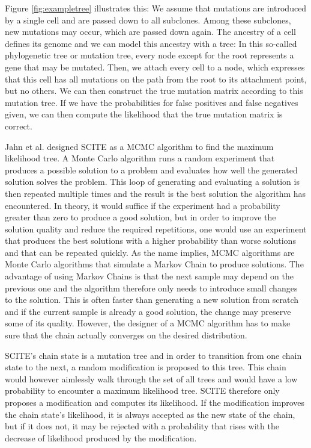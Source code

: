 Figure \ref{fig:exampletree} illustrates this: We assume that mutations are introduced by a single cell and are passed down to all subclones. Among these subclones, new mutations may occur, which are passed down again. The ancestry of a cell defines its genome and we can model this ancestry with a tree: In this so-called phylogenetic tree or mutation tree, every node except for the root represents a gene that may be mutated. Then, we attach every cell to a node, which expresses that this cell has all mutations on the path from the root to its attachment point, but no others. We can then construct the true mutation matrix according to this mutation tree. If we have the probabilities for false positives and false negatives given, we can then compute the likelihood that the true mutation matrix is correct.

Jahn et al. designed \ac{SCITE} as a \ac{MCMC} algorithm to find the maximum likelihood tree. A Monte Carlo algorithm runs a random experiment that produces a possible solution to a problem and evaluates how well the generated solution solves the problem. This loop of generating and evaluating a solution is then repeated multiple times and the result is the best solution the algorithm has encountered. In theory, it would suffice if the experiment had a probability greater than zero to produce a good solution, but in order to improve the solution quality and reduce the required repetitions, one would use an experiment that produces the best solutions with a higher probability than worse solutions and that can be repeated quickly. As the name implies, \ac{MCMC} algorithms are Monte Carlo algorithms that simulate a Markov Chain to produce solutions. The advantage of using Markov Chains is that the next sample may depend on the previous one and the algorithm therefore only needs to introduce small changes to the solution. This is often faster than generating a new solution from scratch and if the current sample is already a good solution, the change may preserve some of its quality. However, the designer of a \ac{MCMC} algorithm has to make sure that the chain actually converges on the desired distribution.

\ac{SCITE}'s chain state is a mutation tree and in order to transition from one chain state to the next, a random modification is proposed to this tree. This chain would however aimlessly walk through the set of all trees and would have a low probability to encounter a maximum likelihood tree. \ac{SCITE} therefore only proposes a modification and computes its likelihood. If the modification improves the chain state's likelihood, it is always accepted as the new state of the chain, but if it does not, it may be rejected with a probability that rises with the decrease of likelihood produced by the modification.

